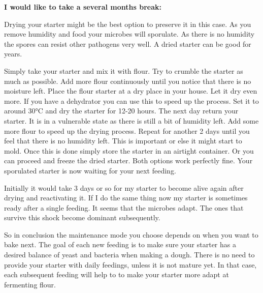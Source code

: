 \textbf{I would like to take a several months break:}

Drying your starter might be the best option to preserve it in this case. As
you remove humidity and food your microbes will sporulate. As there is no
humidity the spores can resist other pathogens very well. A dried starter can
be good for years.

Simply take your starter and mix it with flour. Try to crumble the starter as
much as possible. Add more flour continuously until you notice that there is no
moisture left. Place the flour starter at a dry place in your house. Let it
dry even more. If you have a dehydrator you can use this to speed up the
process. Set it to around 30°C and dry the starter for 12-20 hours. The next
day return your starter. It is in a vulnerable state as there is still a bit
of humidity left. Add some more flour to speed up the drying process. Repeat
for another 2 days until you feel that there is no humidity left. This is
important or else it might start to mold. Once this is done simply store the
starter in an airtight container. Or you can proceed and freeze
the dried starter. Both options work perfectly fine. Your sporulated starter
is now waiting for your next feeding.

Initially it would take 3 days or so for my starter to become alive again
after drying and reactivating it. If I do the same thing now my starter is
sometimes ready after a single feeding. It seems that the microbes adapt. The ones
that survive this shock become dominant subsequently.

So in conclusion the maintenance mode you choose depends on when you want to bake next.
The goal of each new feeding is to make sure your starter
has a desired balance of yeast and bacteria when making a dough. There is no need to provide your
starter with daily feedings, unless it is not mature yet. In that case, each
subsequent feeding will help to to make your starter more adapt at fermenting
flour.

